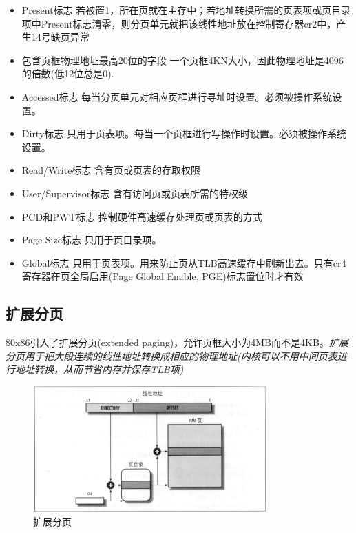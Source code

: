 \begin{itemize}
    \item Present标志
    \subitem 若被置1，所在页就在主存中；若地址转换所需的页表项或页目录项中Present标志清零，则分页单元就把该线性地址放在控制寄存器cr2中，产生14号缺页异常
    \item 包含页框物理地址最高20位的字段
    \subitem 一个页框4KN大小，因此物理地址是4096的倍数(低12位总是0).
    \item Accessed标志
    \subitem 每当分页单元对相应页框进行寻址时设置。必须被操作系统设置。
    \item Dirty标志
    \subitem 只用于页表项。每当一个页框进行写操作时设置。必须被操作系统设置。
    \item Read/Write标志
    \subitem 含有页或页表的存取权限
    \item User/Supervisor标志
    \subitem 含有访问页或页表所需的特权级
    \item PCD和PWT标志
    \subitem 控制硬件高速缓存处理页或页表的方式
    \item Page Size标志
    \subitem 只用于页目录项。
    \item Global标志
    \subitem 只用于页表项。用来防止页从TLB高速缓存中刷新出去。只有cr4寄存器在页全局启用(Page Global Enable, PGE)标志置位时才有效
\end{itemize}

\subsection{扩展分页}

    80x86引入了扩展分页(extended paging)，允许页框大小为4MB而不是4KB。\emph{扩展分页用于把大段连续的线性地址转换成相应的物理地址(内核可以不用中间页表进行地址转换，从而节省内存并保存TLB项)}

\begin{figure}[!htbp]
    \centering
    \includegraphics[width=0.8\textwidth]{image/chapter02/扩展分页.png}
    \caption{扩展分页}
\end{figure}

